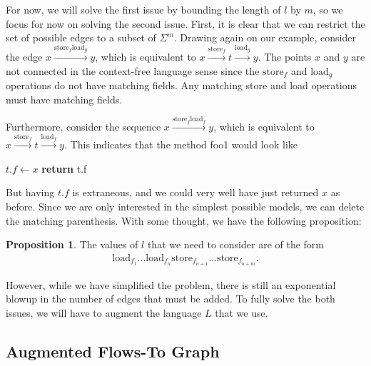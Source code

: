 \documentclass[10pt,twocolumn]{article}
\theoremstyle{definition}
\newtheorem{proposition}[theorem]{Proposition}
\begin{document}
\noindent For now, we will solve the first issue by bounding the length of $l$ by $m$, so we focus for now on solving the second issue. First, it is clear that we can restrict the set of possible edges to a subset of $\Sigma^m$. Drawing again on our example, consider the edge $x\xrightarrow{\text{store}_f\text{load}_g}y$, which is equivalent to $x\xrightarrow{\text{store}_f}t\xrightarrow{\text{load}_g}y$. The points $x$ and $y$ are not connected in the context-free language sense since the $\text{store}_f$ and $\text{load}_g$ operations do not have matching fields. Any matching store and load operations must have matching fields.

Furthermore, consider the sequence $x\xrightarrow{\text{store}_f\text{load}_f}y$, which is equivalent to $x\xrightarrow{\text{store}_f}t\xrightarrow{\text{load}_f}y$. This indicates that the method foo1 would look like
\begin{algorithmic}
	\State$t.f\gets x$
	\State\textbf{return} t.f
\EndProcedure
\end{algorithmic}
But having $t.f$ is extraneous, and we could very well have just returned $x$ as before. Since we are only interested in the simplest possible models, we can delete the matching parenthesis. With some thought, we have the following proposition:
\begin{proposition}
\label{loadstore}
The values of $l$ that we need to consider are of the form
\begin{align*}
\text{load}_{f_1}...\text{load}_{f_n}\text{store}_{f_{n+1}}...\text{store}_{f_{n+m}}.
\end{align*}
\end{proposition}

\noindent However, while we have simplified the problem, there is still an exponential blowup in the number of edges that must be added. To fully solve the both issues, we will have to augment the language $L$ that we use.

\subsection{Augmented Flows-To Graph}
\end{document}
